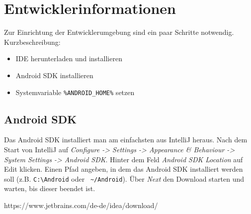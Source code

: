 \documentclass[
	ngerman,
	IMRAD=false,
	DIV=calc,
	paper=a4,
	marginpar=false,
	accentcolor=1c,%
	]{tudapub}
\begin{document}
\section{Entwicklerinformationen} 
Zur Einrichtung der Entwicklerumgebung sind ein paar Schritte notwendig.
Kurzbeschreibung:
\begin{itemize}
    \item IDE herunterladen und installieren
    \item Android SDK installieren
    \item Systemvariable \texttt{\%ANDROID\_HOME\%} setzen
\end{itemize}

\subsection{Android SDK}
Das Android SDK installiert man am einfachsten aus IntelliJ heraus. Nach dem Start von IntelliJ auf \textit{Configure -> Settings -> Appearance \& Behaviour -> System Settings -> Android SDK}.
Hinter dem Feld \textit{Android SDK Location} auf \glqq Edit\grqq{} klicken. Einen Pfad angeben, in dem das Android SDK installiert werden soll (z.B. \texttt{C:\textbackslash Android} oder \texttt{ \textasciitilde/Android}). Über \textit{Next} den Download starten und warten, bis dieser beendet ist.




https://www.jetbrains.com/de-de/idea/download/


\cfoot{\textcolor{lightgray} \today}
\end{document}
